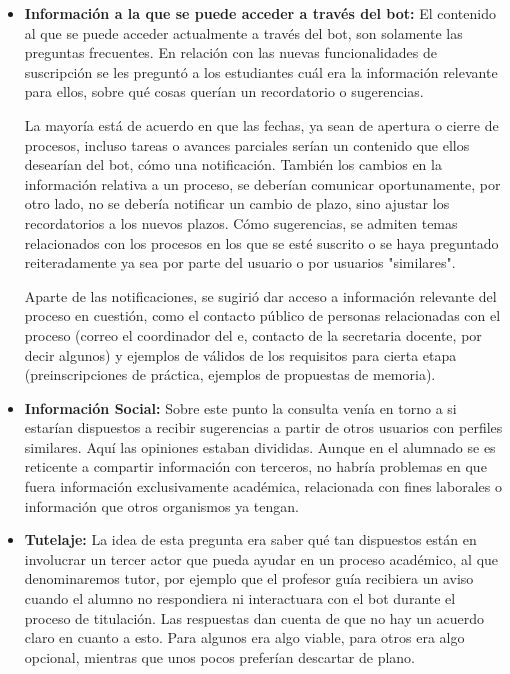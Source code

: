     \begin{itemize}
    \item \textbf{Información a la que se puede acceder a través del bot:} El contenido al que se puede acceder actualmente a través del bot, son solamente las preguntas frecuentes. En relación con las nuevas funcionalidades de suscripción se les preguntó a los estudiantes cuál era la información relevante para ellos, sobre qué cosas querían un recordatorio o sugerencias.
    \par La mayoría está de acuerdo en que las fechas, ya sean de apertura o cierre de procesos, incluso tareas o avances parciales serían un contenido que ellos desearían del bot, cómo una notificación. También los cambios en la información relativa a un proceso, se deberían comunicar oportunamente, por otro lado, no se debería notificar un cambio de plazo, sino ajustar los recordatorios a los nuevos plazos. Cómo sugerencias, se admiten temas relacionados con los procesos en los que se esté suscrito o se haya preguntado reiteradamente ya sea por parte del usuario o por usuarios "similares".
    \par Aparte de las notificaciones, se sugirió dar acceso a información relevante del proceso en cuestión, como el contacto público de personas relacionadas con el proceso (correo el coordinador del \acrshort{e}, contacto de la secretaria docente, por decir algunos) y ejemplos de válidos de los requisitos para cierta etapa (preinscripciones de práctica, ejemplos de propuestas de memoria).
    \item \textbf{Información Social: } Sobre este punto la consulta venía en torno a si estarían dispuestos a recibir sugerencias a partir de otros usuarios con perfiles similares.
    Aquí las opiniones estaban divididas. Aunque en el alumnado se es reticente a compartir información con terceros, no habría problemas en que fuera información exclusivamente académica, relacionada con fines laborales o información que otros organismos ya tengan.
    \item \textbf{Tutelaje:} La idea de esta pregunta era saber qué tan dispuestos están en involucrar un tercer actor que pueda ayudar en un proceso académico, al que denominaremos tutor, por ejemplo que el profesor guía recibiera un aviso cuando el alumno no respondiera ni interactuara con el bot durante el proceso de titulación. Las respuestas dan cuenta de que no hay un acuerdo claro en cuanto a esto. Para algunos era algo viable, para otros era algo opcional, mientras que unos pocos preferían descartar de plano.

\end{itemize}

